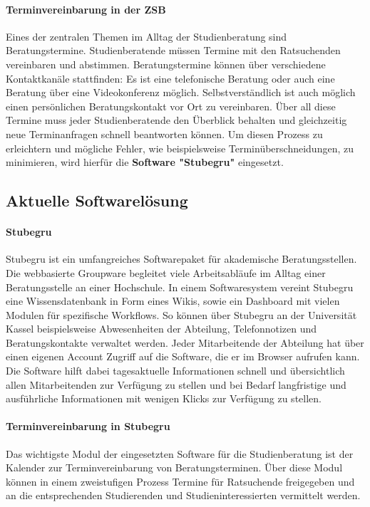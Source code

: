 \documentclass[12pt]{article}
\begin{document}
\paragraph{Terminvereinbarung in der ZSB}
Eines der zentralen Themen im Alltag der Studienberatung sind Beratungstermine.
 Studienberatende müssen Termine mit den Ratsuchenden
vereinbaren und abstimmen. Beratungstermine können über verschiedene
Kontaktkanäle stattfinden: Es ist eine telefonische Beratung oder auch eine
Beratung über eine Videokonferenz möglich. Selbstverständlich ist auch möglich
einen persönlichen Beratungskontakt vor Ort zu vereinbaren. Über all diese
Termine muss jeder Studienberatende den Überblick behalten und gleichzeitig
neue Terminanfragen schnell beantworten können. Um diesen Prozess zu
erleichtern und mögliche Fehler, wie beispielsweise Terminüberschneidungen, zu
minimieren, wird hierfür die \textbf{Software "Stubegru"} eingesetzt.

\subsection{Aktuelle Softwarelösung}
\paragraph{Stubegru}
Stubegru ist ein umfangreiches Softwarepaket für akademische Beratungsstellen.
Die webbasierte Groupware begleitet viele Arbeitsabläufe im Alltag einer
Beratungsstelle an einer Hochschule. In einem Softwaresystem vereint Stubegru
eine Wissensdatenbank in Form eines Wikis, sowie ein Dashboard mit vielen
Modulen für spezifische Workflows. So können über Stubegru an der Universität
Kassel beispielsweise Abwesenheiten der Abteilung, Telefonnotizen und
Beratungskontakte verwaltet werden. Jeder Mitarbeitende der Abteilung hat über
einen eigenen Account Zugriff auf die Software, die er im Browser aufrufen
kann. Die Software hilft dabei tagesaktuelle Informationen schnell und
übersichtlich allen Mitarbeitenden zur Verfügung zu stellen und bei Bedarf
langfristige und ausführliche Informationen mit wenigen Klicks zur Verfügung zu
stellen.\cite{stubegruWebsite}

\paragraph{Terminvereinbarung in Stubegru}
Das wichtigste Modul der eingesetzten Software für die Studienberatung ist der
Kalender zur Terminvereinbarung von Beratungsterminen. Über diese Modul können
in einem zweistufigen Prozess Termine für Ratsuchende freigegeben und an die
entsprechenden Studierenden und Studieninteressierten vermittelt werden.
\end{document}
